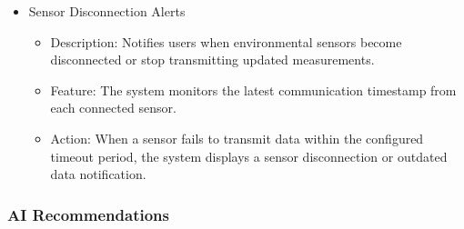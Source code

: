 \documentclass[conference]{IEEEtran}
\begin{document}
\begin{itemize}
    \item Sensor Disconnection Alerts
    \begin{itemize}
        \item Description: Notifies users when environmental sensors become disconnected or stop transmitting updated measurements.
        \item Feature: The system monitors the latest communication timestamp from each connected sensor.
        \item Action: When a sensor fails to transmit data within the configured timeout period, the system displays a sensor disconnection or outdated data notification.
    \end{itemize}
\end{itemize}

\subsubsection{AI Recommendations}
\end{document}
